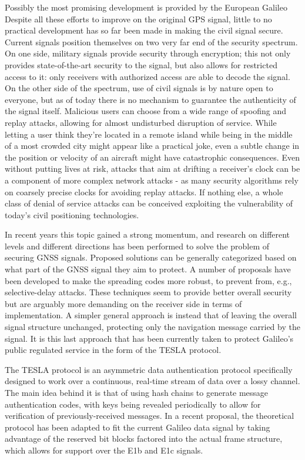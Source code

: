 \vspace{\baselineskip}

Possibly the most promising development is provided by the European Galileo
Despite all these efforts to improve on the original GPS signal, little to no
practical development has so far been made in making the civil signal secure.
Current signals position themselves on two very far end of the security
spectrum. On one side, military signals provide security through encryption;
this not only provides state-of-the-art security to the signal, but also allows
for restricted access to it: only receivers with authorized access are able to
decode the signal. On the other side of the spectrum, use of civil signals is by
nature open to everyone, but as of today there is no mechanism to guarantee the
authenticity of the signal itself. Malicious users can choose from a wide range
of spoofing and replay attacks, allowing for almost undisturbed disruption of
service. While letting a user think they're located in a remote island while
being in the middle of a most crowded city might appear like a practical joke,
even a subtle change in the position or velocity of an aircraft might have
catastrophic consequences. Even without putting lives at risk, attacks that aim
at drifting a receiver's clock can be a component of more complex network
attacks - as many security algorithms rely on coarsely precise clocks for
avoiding replay attacks. If nothing else, a whole class of denial of service
attacks can be conceived exploiting the vulnerability of today's civil
positioning technologies.

In recent years this topic gained a strong momentum, and research on different
levels and different directions has been performed to solve the problem of
securing GNSS signals. Proposed solutions can be generally categorized based
on what part of the GNSS signal they aim to protect. A number of proposals have
been developed to make the spreading codes more robust, to prevent from, e.g.,
selective-delay attacks. These techniques seem to provide better overall
security but are arguably more demanding on the receiver side in terms of
implementation. A simpler general approach is instead that of leaving the
overall signal structure unchanged, protecting only the navigation message
carried by the signal. It is this last approach that has been currently taken to
protect Galileo's public regulated service in the form of the TESLA protocol.

The TESLA protocol is an asymmetric data authentication protocol specifically
designed to work over a continuous, real-time stream of data over a lossy
channel. The main idea behind it is that of using hash chains to generate
message authentication codes, with keys being revealed periodically to allow for
verification of previously-received messages. In a recent proposal, the
theoretical protocol has been adapted to fit the current Galileo data signal by
taking advantage of the reserved bit blocks factored into the actual frame
structure, which allows for support over the E1b and E1c signals. 

